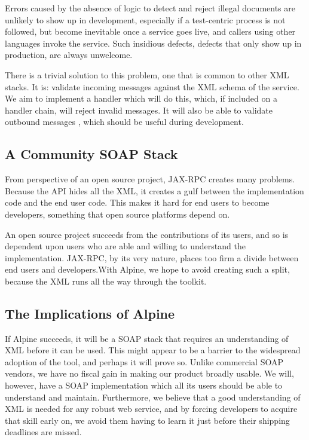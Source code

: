 Errors caused by the absence of logic to detect and reject illegal
documents are unlikely to show up in development, especially if a
test-centric process is not followed, but become inevitable once a
service goes live, and callers using other languages invoke the
service. Such insidious defects, defects that only show up in
production, are always unwelcome.

There is a trivial solution to this problem, one that is common to
other XML stacks. It is: validate incoming messages against the XML
schema of the service.  We aim to implement a handler which will do
this, which, if included on a handler chain, will reject invalid
messages. It will also be able to validate outbound messages , which
should be useful during development.

\subsection{A Community SOAP Stack}
\label{alpine:community}

From perspective of an open source project, JAX-RPC creates many
problems. Because the API hides all the XML, it creates a gulf between
the implementation code and the end user code. This makes it hard for
end users to become developers, something that open source platforms
depend on.

An open source project succeeds from the contributions of its users,
and so is dependent upon users who are able and willing to understand
the implementation. JAX-RPC, by its very nature, places too firm a
divide between end users and developers.With Alpine, we hope to avoid
creating such a split, because the XML runs all the way through the
toolkit.


\subsection{The Implications of Alpine}
\label{alpine:implications}

If Alpine succeeds, it will be a SOAP stack that requires an
understanding of XML before it can be used. This might appear to be a
barrier to the widespread adoption of the tool, and perhaps it will
prove so. Unlike commercial SOAP vendors, we have no fiscal gain in
making our product broadly usable. We will, however, have a SOAP
implementation which all its users should be able to understand and
maintain.  Furthermore, we believe that a good understanding of XML is
needed for any robust web service, and by forcing developers to
acquire that skill early on, we avoid them having to learn it just
before their shipping deadlines are missed.

